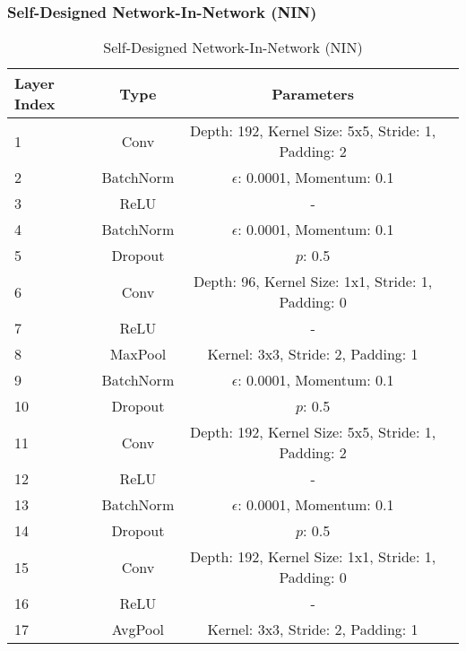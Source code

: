 \documentclass[10pt,twocolumn,letterpaper]{article}
\begin{document}
\subsubsection{Self-Designed Network-In-Network (NIN)}
\begin{table}[ht]
    \caption{Self-Designed Network-In-Network (NIN)}
    \centering
    \scriptsize
    \begin{tabular}{|l|c|c|r}
        \toprule
        \toprule
        Layer Index & Type & Parameters \\
        \midrule
        \multirow{1}{0.5cm}{1} & Conv & Depth: 192, Kernel Size: 5x5, Stride: 1, Padding: 2\\
        \multirow{1}{0.5cm}{2} & BatchNorm & $\epsilon$: 0.0001, Momentum: 0.1\\
        \multirow{1}{0.5cm}{3} & ReLU & -\\
        
        \multirow{1}{0.5cm}{4} & BatchNorm & $\epsilon$: 0.0001, Momentum: 0.1\\
        \multirow{1}{0.5cm}{5} & Dropout & $p$: 0.5\\
        \multirow{1}{0.5cm}{6} & Conv & Depth: 96, Kernel Size: 1x1, Stride: 1, Padding: 0\\
        \multirow{1}{0.5cm}{7} & ReLU & -\\
        
        \multirow{1}{0.5cm}{8} & MaxPool & Kernel: 3x3, Stride: 2, Padding: 1\\
        
        \multirow{1}{0.5cm}{9} & BatchNorm & $\epsilon$: 0.0001, Momentum: 0.1\\
        \multirow{1}{0.5cm}{10} & Dropout & $p$: 0.5\\
        \multirow{1}{0.5cm}{11} & Conv & Depth: 192, Kernel Size: 5x5, Stride: 1, Padding: 2\\
        \multirow{1}{0.5cm}{12} & ReLU & -\\
        
        \multirow{1}{0.5cm}{13} & BatchNorm & $\epsilon$: 0.0001, Momentum: 0.1\\
        \multirow{1}{0.5cm}{14} & Dropout & $p$: 0.5\\
        \multirow{1}{0.5cm}{15} & Conv & Depth: 192, Kernel Size: 1x1, Stride: 1, Padding: 0\\
        \multirow{1}{0.5cm}{16} & ReLU & -\\
        
        \multirow{1}{0.5cm}{17} & AvgPool & Kernel: 3x3, Stride: 2, Padding: 1\\
        

\end{tabular}
\end{table}
\end{document}
